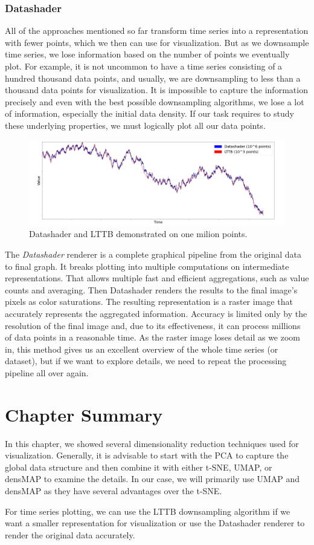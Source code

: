 \subsubsection{Datashader}
All of the approaches mentioned so far transform time series into a representation with fewer points, which we then can use for visualization. But as we downsample time series, we lose information based on the number of points we eventually plot. For example, it is not uncommon to have a time series consisting of a hundred thousand data points, and usually, we are downsampling to less than a thousand data points for visualization. It is impossible to capture the information precisely and even with the best possible downsampling algorithms, we lose a lot of information, especially the initial data density. If our task requires to study these underlying properties, we must logically plot all our data points.
\begin{figure}[tbh]
    \centering
     \includegraphics[width=\textwidth]{img/datashader.png}
    \caption{Datashader and LTTB demonstrated on one milion points.}
    \label{fig:my_label}
\end{figure}

The \textit{Datashader} renderer \cite{vis:datashader} is a complete graphical pipeline from the original data to final graph. It breaks plotting into multiple computations on intermediate representations.
That allows multiple fast and efficient aggregations, such as value counts and averaging. Then Datashader renders the results to the final image's pixels as color saturations. The resulting representation is a raster image that accurately represents the aggregated information. Accuracy is limited only by the resolution of the final image and, due to its effectiveness, it can process millions of data points in a reasonable time. As the raster image loses detail as we zoom in, this method gives us an excellent overview of the whole time series (or dataset), but if we want to explore details, we need to repeat the processing pipeline all over again.


\section{Chapter Summary}
In this chapter, we showed several dimensionality reduction techniques used for visualization. Generally, it is advisable to start with the PCA to capture the global data structure and then combine it with either t-SNE, UMAP, or densMAP to examine the details. In our case, we will primarily use UMAP and densMAP as they have several advantages over the t-SNE.

For time series plotting, we can use the LTTB downsampling algorithm if we want a smaller representation for visualization or use the Datashader renderer to render the original data accurately.
